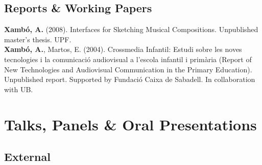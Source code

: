 \documentclass[10pt, a4paper]{article}
\newcommand{\years}[1]{\marginnote{\scriptsize #1}}
\begin{document}
{\subsection*{Reports \& Working Papers}
\noindent

\years{2008}\textbf{Xambó, A.} (2008). Interfaces for Sketching Musical Compositions. Unpublished master's thesis. UPF.\\ 
\years{2004}\textbf{Xambó, A.}, Martos, E. (2004). Crossmedia Infantil: Estudi sobre les noves tecnologies i la comunicació audiovisual a l'escola infantil i primària (Report of New Technologies and Audiovisual Communication in the Primary Education). Unpublished report. Supported by Fundació Caixa de Sabadell. In collaboration with UB.

\section*{Talks, Panels \& Oral Presentations}

\subsection*{External}
\noindent

}
\end{document}

